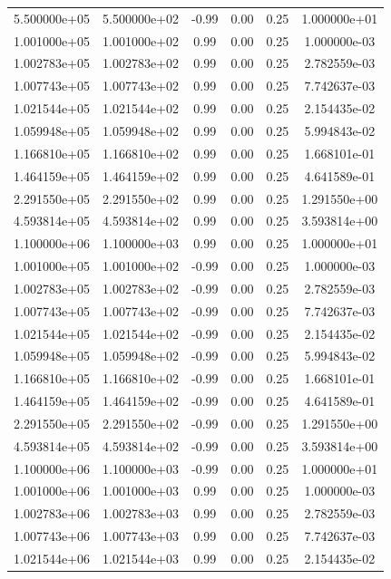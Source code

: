 \documentclass{article}
\begin{document}
\begin{table}[htbp]
\begin{tabular}{cccccc}
5.500000e+05 & 5.500000e+02 & -0.99 & 0.00 & 0.25 & 1.000000e+01 \\
1.001000e+05 & 1.001000e+02 & 0.99 & 0.00 & 0.25 & 1.000000e-03 \\
1.002783e+05 & 1.002783e+02 & 0.99 & 0.00 & 0.25 & 2.782559e-03 \\
1.007743e+05 & 1.007743e+02 & 0.99 & 0.00 & 0.25 & 7.742637e-03 \\
1.021544e+05 & 1.021544e+02 & 0.99 & 0.00 & 0.25 & 2.154435e-02 \\
1.059948e+05 & 1.059948e+02 & 0.99 & 0.00 & 0.25 & 5.994843e-02 \\
1.166810e+05 & 1.166810e+02 & 0.99 & 0.00 & 0.25 & 1.668101e-01 \\
1.464159e+05 & 1.464159e+02 & 0.99 & 0.00 & 0.25 & 4.641589e-01 \\
2.291550e+05 & 2.291550e+02 & 0.99 & 0.00 & 0.25 & 1.291550e+00 \\
4.593814e+05 & 4.593814e+02 & 0.99 & 0.00 & 0.25 & 3.593814e+00 \\
1.100000e+06 & 1.100000e+03 & 0.99 & 0.00 & 0.25 & 1.000000e+01 \\
1.001000e+05 & 1.001000e+02 & -0.99 & 0.00 & 0.25 & 1.000000e-03 \\
1.002783e+05 & 1.002783e+02 & -0.99 & 0.00 & 0.25 & 2.782559e-03 \\
1.007743e+05 & 1.007743e+02 & -0.99 & 0.00 & 0.25 & 7.742637e-03 \\
1.021544e+05 & 1.021544e+02 & -0.99 & 0.00 & 0.25 & 2.154435e-02 \\
1.059948e+05 & 1.059948e+02 & -0.99 & 0.00 & 0.25 & 5.994843e-02 \\
1.166810e+05 & 1.166810e+02 & -0.99 & 0.00 & 0.25 & 1.668101e-01 \\
1.464159e+05 & 1.464159e+02 & -0.99 & 0.00 & 0.25 & 4.641589e-01 \\
2.291550e+05 & 2.291550e+02 & -0.99 & 0.00 & 0.25 & 1.291550e+00 \\
4.593814e+05 & 4.593814e+02 & -0.99 & 0.00 & 0.25 & 3.593814e+00 \\
1.100000e+06 & 1.100000e+03 & -0.99 & 0.00 & 0.25 & 1.000000e+01 \\
1.001000e+06 & 1.001000e+03 & 0.99 & 0.00 & 0.25 & 1.000000e-03 \\
1.002783e+06 & 1.002783e+03 & 0.99 & 0.00 & 0.25 & 2.782559e-03 \\
1.007743e+06 & 1.007743e+03 & 0.99 & 0.00 & 0.25 & 7.742637e-03 \\
1.021544e+06 & 1.021544e+03 & 0.99 & 0.00 & 0.25 & 2.154435e-02 \\

\end{tabular}
\end{table}
\end{document}
